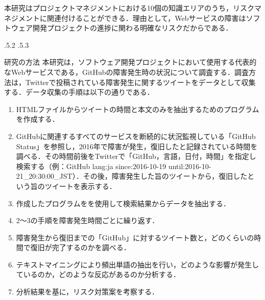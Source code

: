 \documentclass[uplatex]{jsarticle}
\makeatletter
\renewcommand{\section}{%
    \if@slide\clearpage\fi
    \@startsection{section}{1}{\z@}%
    {\Cvs \@plus.5\Cdp \@minus.2\Cdp}%
    {.5\Cvs \@plus.3\Cdp}%
    {\normalfont\raggedright}}
\makeatother
\begin{document}
本研究はプロジェクトマネジメントにおける10個の知識エリアのうち，リスクマネジメントに関連付けることができる．理由として，Webサービスの障害はソフトウェア開発プロジェクトの進捗に関わる明確なリスクだからである．

\section{研究の方法}
本研究は，ソフトウェア開発プロジェクトにおいて使用する代表的なWebサービスである，GitHubの障害発生時の状況について調査する．調査方法は，Twitterで投稿されている障害発生に関するツイートをデータとして収集する．データ収集の手順は以下の通りである\cite{03}．
\begin{enumerate}
 \item HTMLファイルからツイートの時間と本文のみを抽出するためのプログラムを作成する\cite{04}．
 \item GitHubに関連するすべてのサービスを断続的に状況監視している「GitHub Status」を参照し，2016年で障害が発生，復旧したと記録されている時間を調べる．その時間前後をTwitterで「GitHub，言語，日付，時間」を指定し検索する（例：GitHub lang:ja since:2016-10-19 until:2016-10-21\_20:30:00\_JST）．その後，障害発生した旨のツイートから，復旧したという旨のツイートを表示する．
 \item 作成したプログラムをを使用して検索結果からデータを抽出する．
 \item 2～3の手順を障害発生時間ごとに繰り返す．
 \item 障害発生から復旧までの「GitHub」に対するツイート数と，どのくらいの時間で復旧が完了するのかを調べる．
 \item テキストマイニングにより頻出単語の抽出を行い，どのような影響が発生しているのか，どのような反応があるのか分析する．
 \item 分析結果を基に，リスク対策案を考察する．
\end{enumerate}
\end{document}

